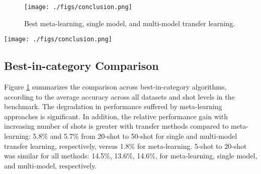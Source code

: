 \documentclass[runningheads]{llncs}
\begin{document}
\begin{figure}[!th]
    \centering
    \texttt{[image: ./figs/conclusion.png]}
    \caption{Best meta-learning, single model, and multi-model transfer learning.}
    \label{fig:inter}
\end{figure}
\fi


\begin{table}[!t]

	\begin{minipage}{0.45\linewidth}
	

		
		\caption{Number of models' effect on test accuracy.}
			\label{tab:num}
	\end{minipage}\hfill
	\begin{minipage}{0.45\linewidth}
\texttt{[image: ./figs/conclusion.png]}
    \label{fig:inter}
	\end{minipage}
\end{table}

\subsection{Best-in-category Comparison }
\label{subsec:inter}

Figure \ref{fig:inter} summarizes the comparison across best-in-category algorithms, according to the average accuracy across all datasets and shot levels in the benchmark. The degradation in performance suffered by meta-learning approaches is significant. In addition, the relative performance gain with increasing number of shots is greater with transfer methods compared to meta-learning: 5.8\% and 5.7\% from 20-shot to 50-shot for single and multi-model transfer learning, respectively, versus 1.8\% for meta-learning. 5-shot to 20-shot was similar for all methods: 14.5\%, 13.6\%, 14.6\%, for meta-learning, single model, and multi-model, respectively. 
\end{document}
